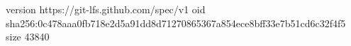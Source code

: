 version https://git-lfs.github.com/spec/v1
oid sha256:0c478aaa0fb718e2d5a91dd8d71270865367a854ece8bff33e7b51cd6c32f4f5
size 43840
